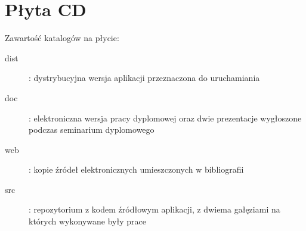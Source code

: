\chapter{Płyta CD}\label{app:plyta}

\begin{figure}[htb]
\makebox[\textwidth]{\framebox[12.8cm]{\rule{0pt}{12.8cm}}}
\end{figure}
\pagebreak

Zawartość katalogów na płycie:
\begin{description}
    \item[dist] : dystrybucyjna wersja aplikacji przeznaczona do uruchamiania 
    \item[doc] : elektroniczna wersja pracy dyplomowej oraz dwie prezentacje wygłoszone podczas seminarium dyplomowego
    \item[web] : kopie źródeł elektronicznych umieszczonych w bibliografii
    \item[src] : repozytorium z kodem źródłowym aplikacji, z dwiema gałęziami na których wykonywane były prace
\end{description}
